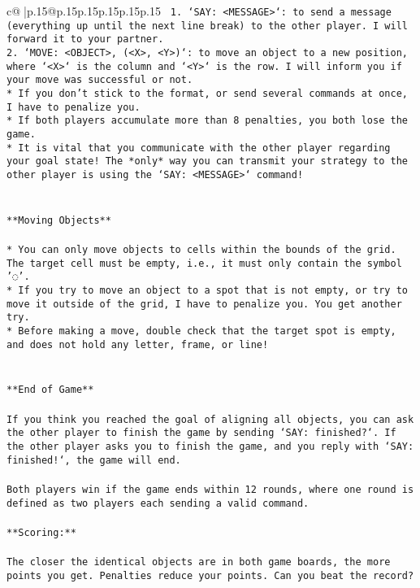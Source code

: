 \documentclass{article}
\begin{document}
{\begin{supertabular}{c@{$\;$}|p{.15\linewidth}@{}p{.15\linewidth}p{.15\linewidth}p{.15\linewidth}p{.15\linewidth}p{.15\linewidth}}
{{{\texttt{ 1. `SAY: <MESSAGE>`: to send a message (everything up until the next line break) to the other player. I will forward it to your partner.} \\
\texttt{2. `MOVE: <OBJECT>, (<X>, <Y>)`: to move an object to a new position, where `<X>` is the column and `<Y>` is the row. I will inform you if your move was successful or not.} \\
\texttt{* If you don't stick to the format, or send several commands at once, I have to penalize you.} \\
\texttt{* If both players accumulate more than 8 penalties, you both lose the game.} \\
\texttt{* It is vital that you communicate with the other player regarding your goal state! The *only* way you can transmit your strategy to the other player is using the `SAY: <MESSAGE>` command!} \\
\\ 
\\ 
\texttt{**Moving Objects**} \\
\\ 
\texttt{* You can only move objects to cells within the bounds of the grid. The target cell must be empty, i.e., it must only contain the symbol '◌'.} \\
\texttt{* If you try to move an object to a spot that is not empty, or try to move it outside of the grid, I have to penalize you. You get another try.} \\
\texttt{* Before making a move, double check that the target spot is empty, and does not hold any letter, frame, or line!} \\
\\ 
\\ 
\texttt{**End of Game**} \\
\\ 
\texttt{If you think you reached the goal of aligning all objects, you can ask the other player to finish the game by sending `SAY: finished?`. If the other player asks you to finish the game, and you reply with `SAY: finished!`, the game will end.} \\
\\ 
\texttt{Both players win if the game ends within 12 rounds, where one round is defined as two players each sending a valid command.} \\
\\ 
\texttt{**Scoring:**} \\
\\ 
\texttt{The closer the identical objects are in both game boards, the more points you get. Penalties reduce your points. Can you beat the record?} \\
}}}
\end{supertabular}}
\end{document}
